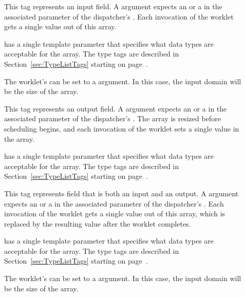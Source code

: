 \begin{description}
\item[] This tag represents an input field. A
   argument expects an  or a
   in the associated parameter of the
  dispatcher's . Each invocation of the worklet gets a
  single value out of this array.

   has a single template parameter that specifies what data
  types are acceptable for the array. The type tags are described in
  Section~\ref{sec:TypeListTags} starting on
  page~\pageref{TypeTagList}.

  The worklet's  can be set to a  argument. In
  this case, the input domain will be the size of the array.

\item[] This tag represents an output field. A
   argument expects an  or a
   in the associated parameter of the
  dispatcher's . The array is resized before scheduling
  begins, and each invocation of the worklet sets a single value in the
  array.

   has a single template parameter that specifies what
  data types are acceptable for the array. The type tags are described in
  Section~\ref{sec:TypeListTags} starting on
  page~\pageref{TypeTagList}.

\item[] This tag represents field that is both an input
  and an output. A  argument expects an
   or a  in
  the associated parameter of the dispatcher's . Each
  invocation of the worklet gets a single value out of this array, which is
  replaced by the resulting value after the worklet completes.

   has a single template parameter that specifies what
  data types are acceptable for the array. The type tags are described in
  Section~\ref{sec:TypeListTags} starting on
  page~\pageref{TypeTagList}.

  The worklet's  can be set to a  argument. In
  this case, the input domain will be the size of the array.

  \commoncontrolsignaturetags
\end{description}

